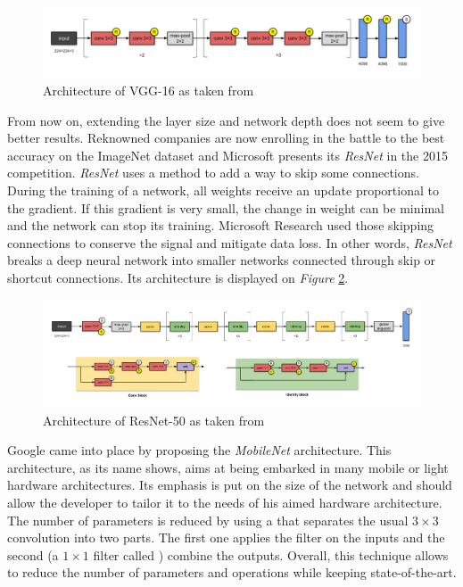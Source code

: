 \begin{figure}[htbp]
	\centering
		\includegraphics[width=14cm]{Figures/VGG-16.png}
	\caption[VGG-16]{Architecture of VGG-16 as taken from \cite{Simonyan2014}}
	\label{fig:VGG-16}
\end{figure}

From now on, extending the layer size and network depth does not seem to give better results. Reknowned companies are now enrolling in the battle to the best accuracy on the ImageNet dataset \cite{ImageNet2009} and Microsoft presents its \emph{ResNet} \cite{He2015} in the 2015 competition. \emph{ResNet} uses a method to add a way to skip some connections. During the training of a network, all weights receive an update proportional to the gradient. If this gradient is very small, the change in weight can be minimal and the network can stop its training. Microsoft Research used those skipping connections to conserve the signal and mitigate data loss. In other words, \emph{ResNet} breaks a deep neural network into smaller networks connected through skip or shortcut connections. Its architecture is displayed on \emph{Figure} \ref{fig:ResNet-50}.

\begin{figure}[htbp]
	\centering
		\includegraphics[width=15cm]{Figures/ResNet-50.png}
	\caption[ResNet-50]{Architecture of ResNet-50 as taken from \cite{He2015}}
	\label{fig:ResNet-50}
\end{figure}

Google came into place by proposing the \emph{MobileNet} \cite{Howard2017} architecture. This architecture, as its name shows, aims at being embarked in many mobile or light hardware architectures. Its emphasis is put on the size of the network and should allow the developer to tailor it to the needs of his aimed hardware architecture. The number of parameters is reduced by using a  that separates the usual $3 \times 3$ convolution into two parts. The first one applies the filter on the inputs and the second (a $1 \times 1$ filter called ) combine the outputs. Overall, this technique allows to reduce the number of parameters and operations while keeping state-of-the-art.

